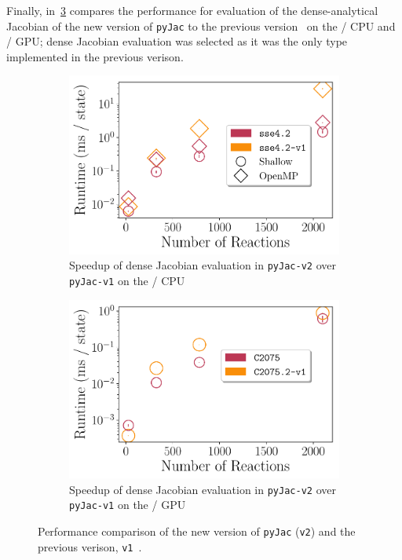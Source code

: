 \documentclass[12pt,number,sort&compress,preprint]{elsarticle}
\begin{document}
Finally, in~\cref{F:v1_vs_v2} compares the performance for evaluation of the dense-analytical Jacobian of the new version of \texttt{pyJac} to the previous version~\cite{pyjac16} on the \sse/ CPU and \gpuold/ GPU; dense Jacobian evaluation was selected as it was the only type implemented in the previous verison.


\begin{figure}[htbp]
   \centering
  \begin{subfigure}[t]{0.48\linewidth}
      \includegraphics[width=\textwidth]{v1_vs_v2.pdf}
      \caption{Speedup of dense Jacobian evaluation in \texttt{pyJac-v2} over \texttt{pyJac-v1} on the \sse/ CPU}
      \label{F:v1_vs_v2_cpu}
  \end{subfigure}
  \hfill
  \begin{subfigure}[t]{0.48\linewidth}
      \includegraphics[width=\textwidth]{v1_vs_v2_gpu.pdf}
      \caption{Speedup of dense Jacobian evaluation in \texttt{pyJac-v2} over \texttt{pyJac-v1} on the \gpuold/ GPU}
      \label{F:v1_vs_v2_gpu}
  \end{subfigure}
  \caption{Performance comparison of the new version of \texttt{pyJac} (\texttt{v2}) and the previous verison, \texttt{v1}~\cite{pyjac16}.}
  \label{F:v1_vs_v2}
\end{figure}
\end{document}
